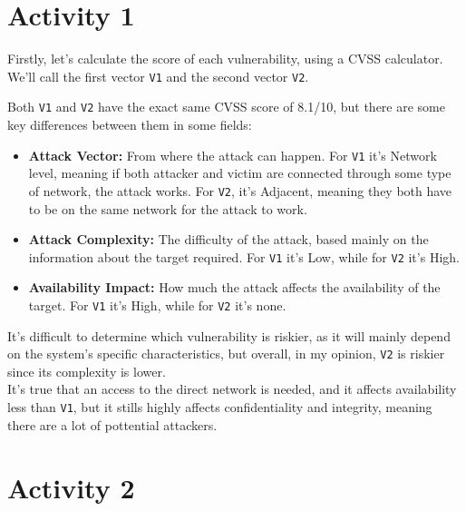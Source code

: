 \section{Activity 1}

Firstly, let's calculate the score of each vulnerability, using a CVSS calculator. We'll call the first vector \texttt{V1} and the second vector \texttt{V2}.


Both \texttt{V1} and \texttt{V2} have the exact same CVSS score of 8.1/10, but there are some key differences between them in some fields:
\begin{itemize}
    \item \textbf{Attack Vector:} From where the attack can happen. For \texttt{V1} it's Network level, meaning if both attacker and victim are connected through some type of network, the attack works. For \texttt{V2}, it's Adjacent, meaning they both have to be on the same network for the attack to work.
    \item \textbf{Attack Complexity:} The difficulty of the attack, based mainly on the information about the target required. For \texttt{V1} it's Low, while for \texttt{V2} it's High.
    \item \textbf{Availability Impact:} How much the attack affects the availability of the target. For \texttt{V1} it's High, while for \texttt{V2} it's none.
\end{itemize}

It's difficult to determine which vulnerability is riskier, as it will mainly depend on the system's specific characteristics, but overall, in my opinion, \texttt{V2} is riskier since its complexity is lower.\\
It's true that an access to the direct network is needed, and it affects availability less than \texttt{V1}, but it stills highly affects confidentiality and integrity, meaning there are a lot of pottential attackers.

\section{Activity 2}


